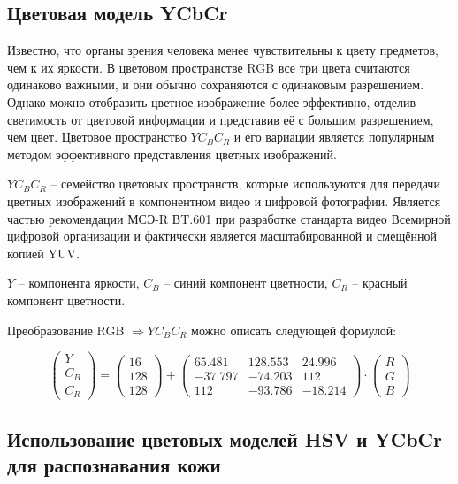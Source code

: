 \subsection{Цветовая модель YCbCr}

Известно, что органы зрения человека менее чувствительны к цвету предметов, чем к их яркости. В
цветовом пространстве RGB все три цвета считаются одинаково важными, и они обычно сохраняются
с одинаковым разрешением. Однако можно отобразить цветное изображение более эффективно, 
отделив светимость от цветовой информации и представив её с большим разрешением, чем цвет.
Цветовое пространство $YC_BC_R$ и его вариации является популярным методом эффективного
представления цветных изображений.

$YC_BC_R$ -- семейство цветовых пространств, которые используются для передачи цветных
изображений в компонентном видео и цифровой фотографии. Является частью рекомендации 
МСЭ-R ВT.601 при разработке стандарта видео Всемирной цифровой организации и фактически
является масштабированной и смещённой копией YUV. 

$Y$ -- компонента яркости, $C_B$ -- синий компонент цветности, $C_R$ -- красный компонент
цветности.

Преобразование RGB $\Rightarrow YC_BC_R$ можно описать следующей
формулой:

\begin{equation}
\begin{pmatrix} Y \\ C_B \\ C_R \end{pmatrix}
=
\begin{pmatrix} 16 \\ 128 \\ 128 \end{pmatrix} + 
\begin{pmatrix}
	65.481 & 128.553 & 24.996\\
	-37.797 & -74.203 & 112\\
	112 & -93.786 & -18.214
\end{pmatrix}
\cdot
\begin{pmatrix} R \\ G \\ B\end{pmatrix}
\label{rgb-to-ycbcr}
\end{equation}

\subsection{\nohyphens{Использование цветовых моделей HSV и YCbCr для 
распознавания кожи}}

